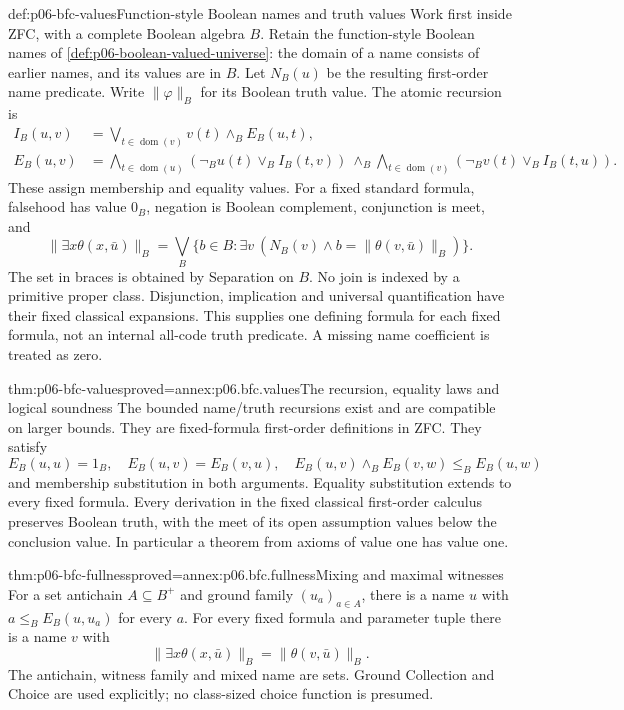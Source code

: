 \begin{hbdefinition}{def:p06-bfc-values}{Function-style Boolean names and truth values}
Work first inside ZFC, with a complete Boolean algebra \(B\).
Retain the function-style Boolean names of
\cref{def:p06-boolean-valued-universe}: the domain of a name consists of
earlier names, and its values are in \(B\). Let \(N_B(u)\) be the resulting
first-order name predicate. Write \(\lVert\varphi\rVert_B\) for its
Boolean truth value. The atomic recursion is
\[
\begin{aligned}
 I_B(u,v)&=\bigvee_{t\in\operatorname{dom}(v)}v(t)\wedge_B E_B(u,t),\\
 E_B(u,v)&=\bigwedge_{t\in\operatorname{dom}(u)}
       (\neg_B u(t)\vee_B I_B(t,v))\
       \wedge_B
       \bigwedge_{t\in\operatorname{dom}(v)}
       (\neg_B v(t)\vee_B I_B(t,u)).
\end{aligned}
\]
These assign membership and equality values. For a fixed standard formula,
falsehood has value \(0_B\), negation is Boolean complement, conjunction
is meet, and
\[
 \lVert\exists x\theta(x,\bar u)\rVert_B
 =\bigvee_B\{b\in B:\exists v\ (N_B(v)\land
                             b=\lVert\theta(v,\bar u)\rVert_B)\}.
\]
The set in braces is obtained by Separation on \(B\). No join is indexed
by a primitive proper class. Disjunction, implication and universal
quantification have their fixed classical expansions. This supplies one
defining formula for each fixed formula, not an internal all-code truth
predicate. A missing name coefficient is treated as zero.
\end{hbdefinition}

\begin{hbtheorem}{thm:p06-bfc-values}{proved=annex:p06.bfc.values}{The recursion, equality laws and logical soundness}
The bounded name/truth recursions exist and are compatible on larger bounds.
They are fixed-formula first-order definitions in ZFC. They satisfy
\[
 E_B(u,u)=1_B,\quad E_B(u,v)=E_B(v,u),\quad
 E_B(u,v)\wedge_B E_B(v,w)\leq_B E_B(u,w)
\]
and membership substitution in both arguments. Equality substitution
extends to every fixed formula. Every derivation in the fixed classical
first-order calculus preserves Boolean truth, with the meet of its open
assumption values below the conclusion value. In particular a theorem
from axioms of value one has value one.
\end{hbtheorem}

\begin{hbtheorem}{thm:p06-bfc-fullness}{proved=annex:p06.bfc.fullness}{Mixing and maximal witnesses}
For a set antichain \(A\subseteq B^+\) and ground family \((u_a)_{a\in A}\),
there is a name \(u\) with \(a\leq_B E_B(u,u_a)\) for every \(a\).
For every fixed formula and parameter tuple there is a name \(v\) with
\[
 \lVert\exists x\theta(x,\bar u)\rVert_B
       =\lVert\theta(v,\bar u)\rVert_B.
\]
The antichain, witness family and mixed name are sets. Ground Collection
and Choice are used explicitly; no class-sized choice function is presumed.
\end{hbtheorem}

